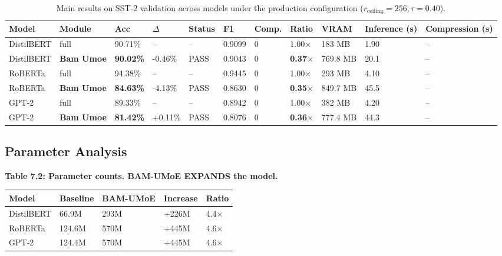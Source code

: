 \begin{table}[t]
\centering
\small
\begin{tabular}{lllllllllll}
\toprule
\textbf{Model} & \textbf{Module} & \textbf{Acc} & \textbf{$\Delta$} & \textbf{Status} & \textbf{F1} & \textbf{Comp.} & \textbf{Ratio} & \textbf{VRAM} & \textbf{Inference (s)} & \textbf{Compression (s)} \\
\midrule
DistilBERT & full & 90.71\% & -- & -- & 0.9099 & 0 & 1.00$\times$ & 183 MB & 1.90 & -- \\
DistilBERT & \textbf{Bam Umoe} & \textbf{90.02\%} & -0.46\% & PASS & 0.9043 & 0 & \textbf{0.37$\times$} & 769.8 MB & 20.1 & -- \\
RoBERTa & full & 94.38\% & -- & -- & 0.9445 & 0 & 1.00$\times$ & 293 MB & 4.10 & -- \\
RoBERTa & \textbf{Bam Umoe} & \textbf{84.63\%} & -4.13\% & PASS & 0.8630 & 0 & \textbf{0.35$\times$} & 849.7 MB & 45.5 & -- \\
GPT-2 & full & 89.33\% & -- & -- & 0.8942 & 0 & 1.00$\times$ & 382 MB & 4.20 & -- \\
GPT-2 & \textbf{Bam Umoe} & \textbf{81.42\%} & +0.11\% & PASS & 0.8076 & 0 & \textbf{0.36$\times$} & 777.4 MB & 44.3 & -- \\
\bottomrule
\end{tabular}
\caption{Main results on SST-2 validation across models under the production configuration ($r_{\mathrm{ceiling}}=256, \tau=0.40$).}
\label{tab:main_sst2}
\end{table}

\subsection{Parameter Analysis}

\textbf{Table 7.2: Parameter counts. BAM-UMoE EXPANDS the model.}

\begin{table}[H]
\centering
\small
\begin{tabular}{lllll}
\toprule
\textbf{Model} & \textbf{Baseline} & \textbf{BAM-UMoE} & \textbf{Increase} & \textbf{Ratio} \\
\midrule
DistilBERT & 66.9M & 293M & +226M & 4.4$\times$ \\
RoBERTa & 124.6M & 570M & +445M & 4.6$\times$ \\
GPT-2 & 124.4M & 570M & +445M & 4.6$\times$ \\
\bottomrule
\end{tabular}
\end{table}

